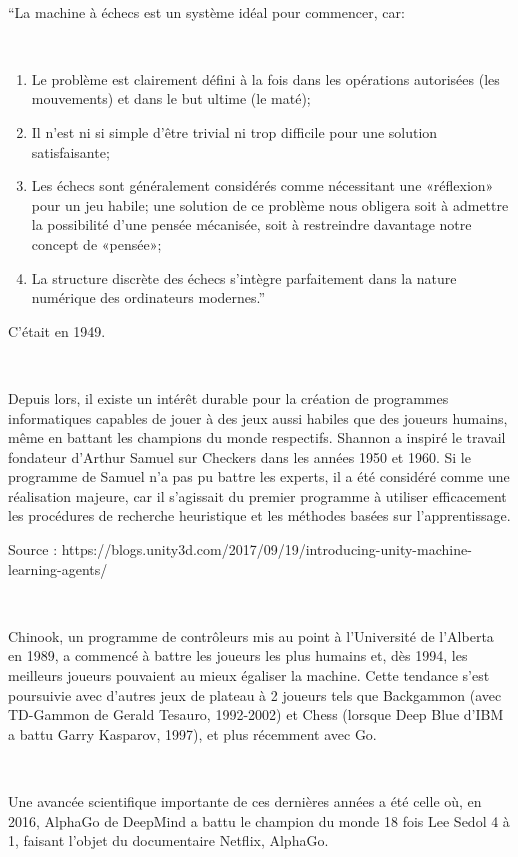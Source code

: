 ~\par
“La machine à échecs est un système idéal pour commencer, car: 

~\par
\begin{enumerate}
\item Le problème est clairement défini à la fois dans les opérations autorisées (les mouvements) et dans le but ultime (le maté); 
\item Il n'est ni si simple d'être trivial ni trop difficile pour une solution satisfaisante; 
\item Les échecs sont généralement considérés comme nécessitant une «réflexion» pour un jeu habile; une solution de ce problème nous obligera soit à admettre la possibilité d'une pensée mécanisée, soit à restreindre davantage notre concept de «pensée»; 
\item La structure discrète des échecs s’intègre parfaitement dans la nature numérique des ordinateurs modernes.”

\end{enumerate}

C'était en 1949.

~\par
Depuis lors, il existe un intérêt durable pour la création de programmes informatiques capables de jouer à des jeux aussi habiles que des joueurs humains, même en battant les champions du monde respectifs. Shannon a inspiré le travail fondateur d’Arthur Samuel sur Checkers dans les années 1950 et 1960. Si le programme de Samuel n’a pas pu battre les experts, il a été considéré comme une réalisation majeure, car il s’agissait du premier programme à utiliser efficacement les procédures de recherche heuristique et les méthodes basées sur l’apprentissage.

Source : https://blogs.unity3d.com/2017/09/19/introducing-unity-machine-learning-agents/

~\par
Chinook, un programme de contrôleurs mis au point à l’Université de l’Alberta en 1989, a commencé à battre les joueurs les plus humains et, dès 1994, les meilleurs joueurs pouvaient au mieux égaliser la machine. Cette tendance s’est poursuivie avec d’autres jeux de plateau à 2 joueurs tels que Backgammon (avec TD-Gammon de Gerald Tesauro, 1992-2002) et Chess (lorsque Deep Blue d’IBM a battu Garry Kasparov, 1997), et plus récemment avec Go.

~\par
Une avancée scientifique importante de ces dernières années a été celle où, en 2016, AlphaGo de DeepMind a battu le champion du monde 18 fois Lee Sedol 4 à 1, faisant l’objet du documentaire Netflix, AlphaGo. 


